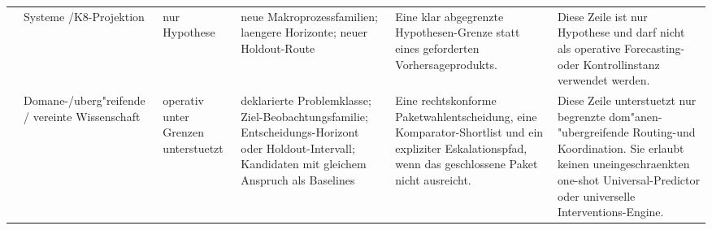\begin{longtable}{@{}L{0.13\textwidth}L{0.14\textwidth}L{0.12\textwidth}L{0.18\textwidth}L{0.17\textwidth}L{0.20\textwidth}@{}}
 & Systeme /\allowbreak K8-Projektion & nur Hypothese & neue Makroprozessfamilien; \allowbreak laengere Horizonte; \allowbreak neuer Holdout-Route & Eine klar abgegrenzte Hypothesen-Grenze statt eines geforderten Vorhersageprodukts. & Diese Zeile ist nur Hypothese und darf nicht als operative Forecasting- oder Kontrollinstanz verwendet werden. \\
 & Domane-/\allowbreak uberg"reifende / vereinte Wissenschaft & operativ unter Grenzen unterstuetzt & deklarierte Problemklasse; \allowbreak Ziel-Beobachtungsfamilie; \allowbreak Entscheidungs-Horizont oder Holdout-Intervall; \allowbreak Kandidaten mit gleichem Anspruch als Baselines & Eine rechtskonforme Paketwahlentscheidung, eine Komparator-Shortlist und ein expliziter Eskalationspfad, wenn das geschlossene Paket nicht ausreicht. & Diese Zeile unterstuetzt nur begrenzte dom"anen-\allowbreak "ubergreifende Routing-und Koordination. Sie erlaubt keinen uneingeschraenkten one-shot Universal-Predictor oder universelle Interventions-Engine. \\
\bottomrule
\end{longtable}

